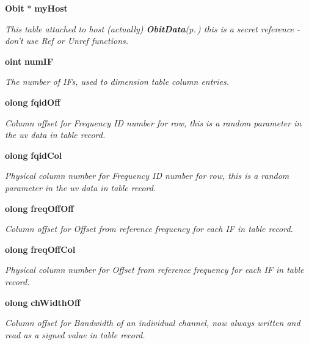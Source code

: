 \begin{CompactItemize}
{\bf Obit} $\ast$ {\bf my\-Host}
\begin{CompactList}\small\item\em This table attached to host (actually) {\bf Obit\-Data}{\rm (p.\,\pageref{structObitData})} this is a secret reference - don't use Ref or Unref functions. \item\end{CompactList}\item 
{\bf oint} {\bf num\-IF}
\begin{CompactList}\small\item\em The number of IFs, used to dimension table column entries. \item\end{CompactList}\item 
{\bf olong} {\bf fqid\-Off}
\begin{CompactList}\small\item\em Column offset for Frequency ID number for row, this is a random parameter in the uv data in table record. \item\end{CompactList}\item 
{\bf olong} {\bf fqid\-Col}
\begin{CompactList}\small\item\em Physical column number for Frequency ID number for row, this is a random parameter in the uv data in table record. \item\end{CompactList}\item 
{\bf olong} {\bf freq\-Off\-Off}
\begin{CompactList}\small\item\em Column offset for Offset from reference frequency for each IF in table record. \item\end{CompactList}\item 
{\bf olong} {\bf freq\-Off\-Col}
\begin{CompactList}\small\item\em Physical column number for Offset from reference frequency for each IF in table record. \item\end{CompactList}\item 
{\bf olong} {\bf ch\-Width\-Off}
\begin{CompactList}\small\item\em Column offset for Bandwidth of an individual channel, now always written and read as a signed value in table record. \item\end{CompactList}\item 

\end{CompactItemize}
